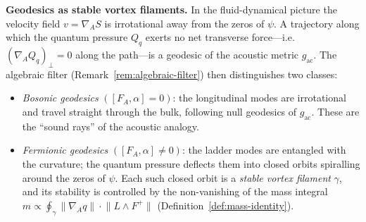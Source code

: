 \begin{remark}
\medskip
\noindent\textbf{Geodesics as stable vortex filaments.}\;
In the fluid-dynamical picture the velocity field $v = \nabla_{\!A} S$
is irrotational away from the zeros of $\psi$.  A trajectory along which
the quantum pressure $Q_q$ exerts no net transverse force---i.e.\
$(\nabla_{\!A} Q_q)_\perp = 0$ along the path---is a geodesic of the
acoustic metric $g_{\mathrm{ac}}$.  The algebraic filter
(Remark~\ref{rem:algebraic-filter}) then distinguishes two classes:
\begin{itemize}
  \item \emph{Bosonic geodesics} $([F_A, \alpha] = 0)$: the
        longitudinal modes are irrotational and travel straight through
        the bulk, following null geodesics of $g_{\mathrm{ac}}$.  These
        are the ``sound rays'' of the acoustic analogy.
  \item \emph{Fermionic geodesics} $([F_A, \alpha] \neq 0)$: the
        ladder modes are entangled with the curvature; the quantum
        pressure deflects them into closed orbits spiralling around the
        zeros of $\psi$.  Each such closed orbit is a \emph{stable
        vortex filament} $\gamma$, and its stability is controlled by the
        non-vanishing of the mass integral
        $m \propto \oint_\gamma \lVert\nabla_{\!A} q\rVert \cdot
        \lVert L \wedge F^+\rVert$
        (Definition~\ref{def:mass-identity}).
\end{itemize}


\end{remark}
